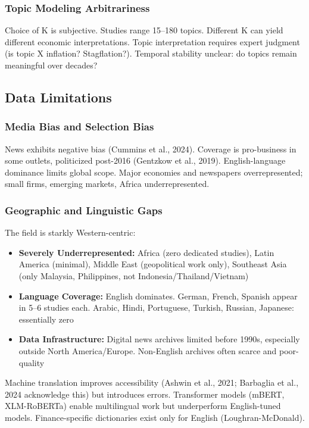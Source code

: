\documentclass[12pt,a4paper]{article}
\begin{document}
\subsubsection{Topic Modeling Arbitrariness}

Choice of K is subjective. Studies range 15--180 topics. Different K can yield different economic interpretations. Topic interpretation requires expert judgment (is topic X inflation? Stagflation?). Temporal stability unclear: do topics remain meaningful over decades?

\subsection{Data Limitations}
\label{subsec:data_lim}

\subsubsection{Media Bias and Selection Bias}

News exhibits negative bias (Cummins et al., 2024). Coverage is pro-business in some outlets, politicized post-2016 (Gentzko\-w et al., 2019). English-language dominance limits global scope. Major economies and newspapers overrepresented; small firms, emerging markets, Africa underrepresented.

\subsubsection{Geographic and Linguistic Gaps}

The field is starkly Western-centric:
\begin{itemize}
\item \textbf{Severely Underrepresented:} Africa (zero dedicated studies), Latin America (minimal), Middle East (geopolitical work only), Southeast Asia (only Malaysia, Philippines, not Indonesia/Thailand/Vietnam)
\item \textbf{Language Coverage:} English dominates. German, French, Spanish appear in 5--6 studies each. Arabic, Hindi, Portuguese, Turkish, Russian, Japanese: essentially zero
\item \textbf{Data Infrastructure:} Digital news archives limited before 1990s, especially outside North America/Europe. Non-English archives often scarce and poor-quality
\end{itemize}

Machine translation improves accessibility (Ashwin et al., 2021; Barbaglia et al., 2024 acknowledge this) but introduces errors. Transformer models (mBERT, XLM-RoBERTa) enable multilingual work but underperform English-tuned models. Finance-specific dictionaries exist only for English (Loughran-McDonald).
\end{document}
